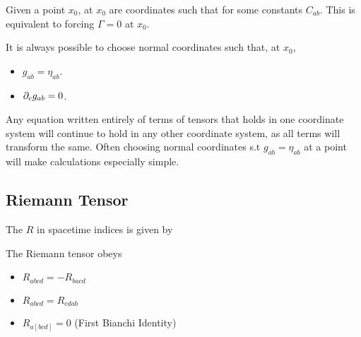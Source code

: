 \documentclass{article}
\begin{document}
\begin{definition}
Given a point $x_0$,  at $x_0$ are coordinates such that 
for some constants $C_{ab}$. This is equivalent to forcing $\Gamma = 0$ at $x_0$. 
\end{definition}

\begin{lemma}
It is always possible to choose normal coordinates such that, at $x_0$, 
\begin{itemize}
    \item $g_{ab} = \eta_{ab}$.
    \item $\partial_c g_{ab} = 0$.
\end{itemize}
\end{lemma}

\begin{idea}
Any equation written entirely of terms of tensors that holds in one coordinate system will continue to hold in any other coordinate system, as all terms will transform the same. Often choosing normal coordinates s.t $g_{ab} = \eta_{ab}$ at a point will make calculations especially simple. 
\end{idea}

\subsection{Riemann Tensor}

\begin{definition}
The  $R$ in spacetime indices is given by
\end{definition}

\begin{theorem}
The Riemann tensor obeys 
\begin{itemize}
    \item $R_{abcd} = -R_{bacd}$
    \item $R_{abcd} = R_{cdab}$
    \item $R_{a[bcd]} = 0$ (First Bianchi Identity)
\end{itemize}
\end{theorem}
\end{document}
